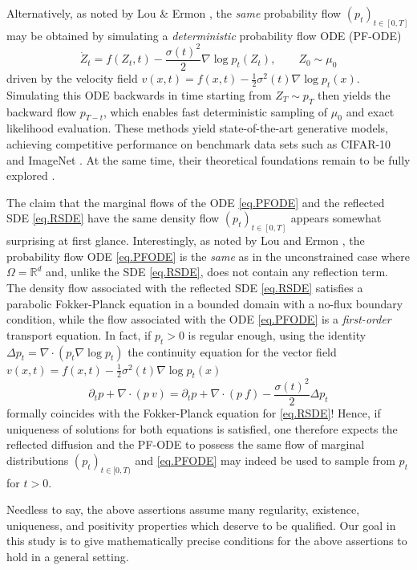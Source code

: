 \documentclass[11pt]{amsart}
\theoremstyle{definition}
\newcommand{\dive}{\nabla\!\cdot}
\begin{document}
Alternatively, as noted by Lou \& Ermon \cite{LouErmon}, the {\it same} probability flow $(p_t)_{t\in [0,T]}$ may be obtained by simulating a {\it deterministic}  probability flow ODE (PF-ODE)
\begin{equation}
\dot Z_t=f(Z_t,t)- \frac{\sigma(t)^2}{2}
\nabla \log p_t(Z_t),\qquad Z_0\sim \mu_0    \label{eq.PFODE} 
\end{equation}
driven by the velocity field $v(x,t)=f(x,t)-\tfrac 12\sigma^2(t)\nabla \log p_t(x)$. Simulating this ODE backwards in time starting from $Z_T\sim p_T$ then yields the backward flow $p_{T-t}$,
which enables fast deterministic sampling  of $\mu_0$ and exact likelihood evaluation. 
These methods yield state-of-the-art  generative models, 
achieving competitive performance on benchmark data sets such as CIFAR-10 and ImageNet \cite{LouErmon}. At the same time, their theoretical foundations remain to be fully explored \cite{chen2024}.


The claim \cite{LouErmon} that the marginal flows of the ODE \eqref{eq.PFODE} and the reflected SDE \eqref{eq.RSDE} have the same density flow $(p_t)_{t\in[0,T]}$ appears somewhat surprising at first glance.  Interestingly, as noted by 
Lou and Ermon \cite{LouErmon}, the  probability flow ODE \eqref{eq.PFODE} is the {\it same} as in the unconstrained case where $\Omega=\mathbb{R}^d$ \cite{pfode,Song2021} and, unlike the SDE \eqref{eq.RSDE}, does not contain any reflection term.  The density flow associated with the reflected SDE \eqref{eq.RSDE} satisfies a parabolic Fokker-Planck equation in a bounded domain with a no-flux boundary condition, while the flow associated with the ODE \eqref{eq.PFODE} is a {\it first-order}   transport equation. 
In fact,  if $p_t>0$ is regular enough, using the identity $\Delta p_t=\nabla\cdot{}(p_t\nabla\log p_t)$ the continuity equation for  the vector field $v(x,t)=f(x,t)-\tfrac 12\sigma^2(t)\nabla \log p_t(x)$
$$ \partial_t p + \dive(p\ v)=\partial_t p + \dive(p\ f)-\frac{\sigma(t)^2}{2}\Delta p_t$$
formally coincides with the Fokker-Planck equation for \eqref{eq.RSDE}! Hence, if uniqueness of solutions for both equations is satisfied, one   therefore expects the reflected diffusion and the PF-ODE to possess the same flow of marginal distributions $(p_t)_{t\in[0,T)}$ and \eqref{eq.PFODE} may indeed be used to sample from $p_t$ for $t>0$.

Needless to say, the above assertions assume  many  regularity, existence, uniqueness, and positivity properties which deserve to be qualified.
Our goal in this study is to give mathematically precise conditions for the above assertions to hold in a general setting. 
\end{document}
